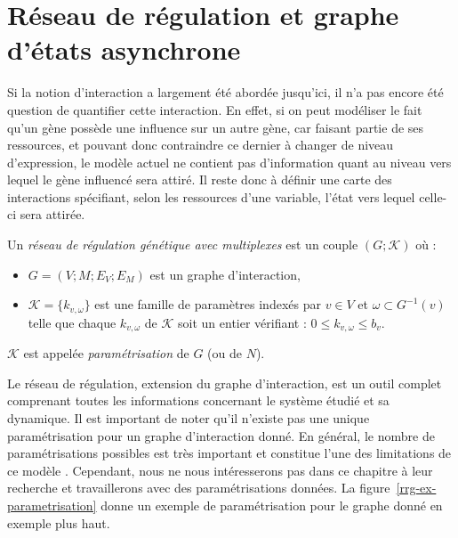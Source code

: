 \section{Réseau de régulation et graphe d'états asynchrone}
\label{rrg-reseau-de-regulation}
Si la notion d'interaction a largement été abordée jusqu'ici, il n'a pas encore été question de quantifier cette interaction. En effet, si on peut modéliser le fait qu'un gène possède une influence sur un autre gène, car faisant partie de ses ressources, et pouvant donc contraindre ce dernier à changer de niveau d'expression, le modèle actuel ne contient pas d'information quant au niveau vers lequel le gène influencé sera attiré. Il reste donc à définir une \og carte \fg{} des interactions spécifiant, selon les ressources d'une variable, l'état vers lequel celle-ci sera attirée.
\begin{definition}
Un \emph{réseau de régulation génétique avec multiplexes} est un couple $(G ; \mathcal{K})$ où :
\begin{itemize}
  \item $G = (V ; M ; E_V ; E_M)$ est un graphe d'interaction,
  \item $\mathcal{K} = \{k_{v, \omega}\}$ est une famille de paramètres indexés par $v \in V$ et $\omega \subset G^{-1}(v)$ telle que chaque $k_{v, \omega}$ de $\mathcal{K}$ soit un entier vérifiant : $0 \leq k_{v, \omega} \leq b_v$.
\end{itemize}
$\mathcal{K}$ est appelée \emph{paramétrisation} de $G$ (ou de $N$).
\end{definition}

Le réseau de régulation, extension du graphe d'interaction, est un outil complet comprenant toutes les informations concernant le système étudié et sa dynamique. Il est important de noter qu'il n'existe pas une unique paramétrisation pour un graphe d'interaction donné. En général, le nombre de paramétrisations possibles est très important et constitue l'une des limitations de ce modèle \cite{richard-comet-bernot-08}. Cependant, nous ne nous intéresserons pas dans ce chapitre à leur recherche et travaillerons avec des paramétrisations données. La figure~\ref{rrg-ex-parametrisation} donne un exemple de paramétrisation pour le graphe donné en exemple plus haut.\\


